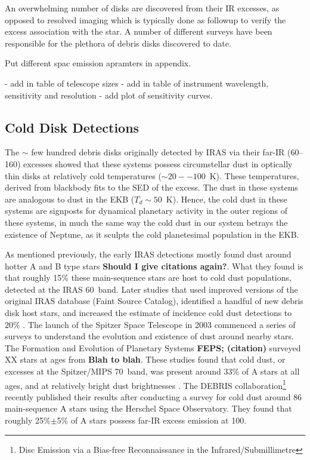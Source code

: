    An overwhelming number of disks are discovered from their IR excesses, as opposed to resolved imaging which is typically done as followup to verify the excess association with the star. A number of different surveys have been responsible for the plethora of debris disks discovered to date. 
   
   Put different spac emission apramters in appendix.
   
   - add in table of telescope sizes
   - add in table of instrument wavelength, sensitivity and resolution
   - add plot of sensitivity curves.
   
   
   
   \subsection{Cold Disk Detections}
   
   
    The $\sim$ few hundred debris disks originally detected by IRAS via their far-IR (60--160\micron) excesses showed that these systems possess circumstellar dust in optically thin disks at relatively cold temperatures ($\sim20--100$~K). These temperatures, derived from blackbody fits to the SED of the excess. The dust in these systems are analogous to dust in the EKB ($T_d\sim50$~K). Hence, the cold dust in these systems are signposts for dynamical planetary activity in the outer regions of these systems, in much the same way the cold dust in our system betrays the existence of Neptune, as it sculpts the cold planetesimal population in the EKB. 
   
   As mentioned previously, the early IRAS detections mostly found dust around hotter A and B type stars \textbf{Should I give citations again?}. What they found is that roughly 15\% these main-sequence stars are host to cold dust populations, detected at the IRAS 60\micron\ band. Later studies that used improved versions of the original IRAS database (Faint Source Catalog), identified a handful of new debris disk host stars, and increased the estimate of incidence cold dust detections to 20\% \citep{Rhee2007}. The launch of the Spitzer Space Telescope in 2003 commenced a series of surveys to understand the evolution and existence of dust around nearby stars. The Formation and Evolution of Planetary Systems  \textbf{FEPS; (citation)} surveyed XX stars at ages from \textbf{Blah to blah}.  These studies found that cold dust, or excesses at the Spitzer/MIPS 70\micron\ band, was present around 33\% of A stars at all ages, and at relatively bright dust brightnesses \citep{Su2006}. The DEBRIS collaboration\footnote{Disc Emission via a Bias-free Reconnaissance in the Infrared/Submillimetre} recently published their results after conducting a survey for cold dust around 86 main-sequence A stars using the Herschel Space Observatory. They found that roughly 25\%$\pm$5\% of A stars possess far-IR excess emission at 100\micron \citep{Thureau2014}. 
   
